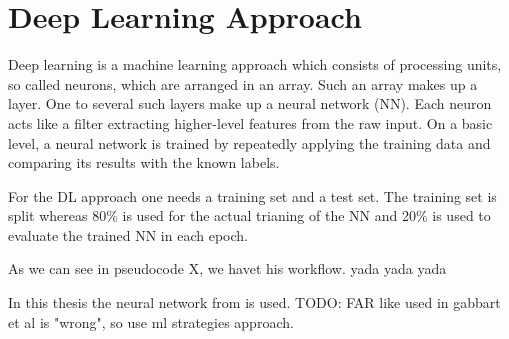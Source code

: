 
\section{Deep Learning Approach}

Deep learning is a machine learning approach which consists of processing
units, so called neurons, which are arranged in an array. Such an array makes up
a layer. One to several such layers make up a neural network (NN). Each neuron
acts like a filter extracting higher-level features from the raw input. On a 
basic level, a neural network is trained by repeatedly applying the training
data and comparing its results with the known labels.

For the DL approach one needs a training set and a test set. The training set
is split whereas 80\% is used for the actual trianing of the NN and 20\% is used
to evaluate the trained NN in each epoch. 

As we can see in pseudocode X, we havet his workflow. yada yada yada





In this thesis the neural network from \cite{schaefer2021training} is used.
TODO: FAR like used in gabbart et al is "wrong", so use ml strategies approach.




